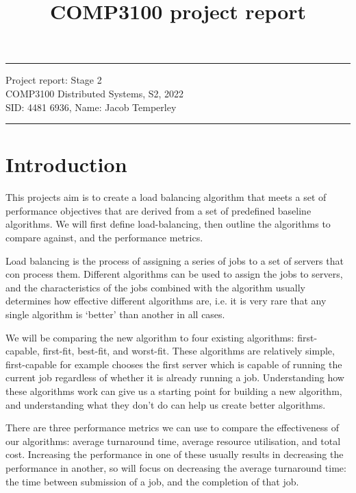 \documentclass[a4paper]{article} %
\begin{document}

\title{COMP3100 project report} %
\fancyhead[C]{}
\hrule \medskip %
\begin{minipage}{1\textwidth} %
\centering 
\large %
Project report: Stage 2\\ %
COMP3100 Distributed Systems, S2, 2022\\
\normalsize %
SID: 4481 6936, Name: Jacob Temperley
\end{minipage}
\medskip\hrule %
\bigskip

\section{Introduction}
This projects aim is to create a load balancing algorithm that meets a set of performance objectives that are derived from a set of predefined baseline algorithms. We will first define load-balancing, then outline the algorithms to compare against, and the performance metrics.\par
Load balancing is the process of assigning a series of jobs to a set of servers that con process them. Different algorithms can be used to assign the jobs to servers, and the characteristics of the jobs combined with the algorithm usually determines how effective different algorithms are, i.e. it is very rare that any single algorithm is ‘better’ than another in all cases.\par
We will be comparing the new algorithm to four existing algorithms: first-capable, first-fit, best-fit, and worst-fit. These algorithms are relatively simple, first-capable for example chooses the first server which is capable of running the current job regardless of whether it is already running a job. Understanding how these algorithms work can give us a starting point for building a new algorithm, and understanding what they don’t do can help us create better algorithms.\par
There are three performance metrics we can use to compare the effectiveness of our algorithms: average turnaround time, average resource utilisation, and total cost. Increasing the performance in one of these usually results in decreasing the performance in another, so will focus on decreasing the average turnaround time: the time between submission of a job, and the completion of that job.\par
\end{document}
